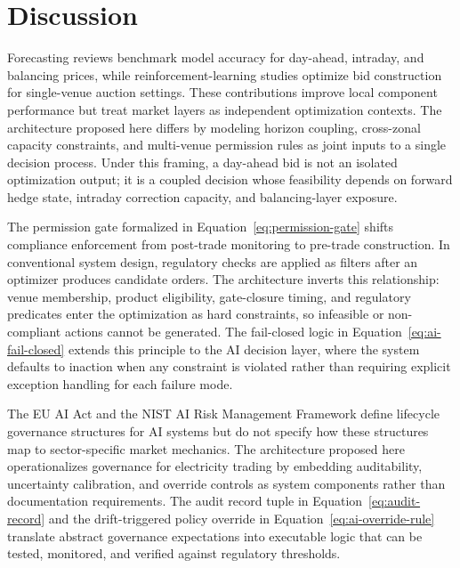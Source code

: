 \documentclass[oneside,10pt]{swissi}
\begin{document}
\section{Discussion}
Forecasting reviews benchmark model accuracy for day-ahead, intraday, and balancing prices, while reinforcement-learning studies optimize bid construction for single-venue auction settings.\cite{lago_marcjasz_schutter_weron_2021_epf,oconnor_bahloul_prestwich_visentin_2025_epf,di_persio_garbelli_giordano_2025_rl_bidding} These contributions improve local component performance but treat market layers as independent optimization contexts. The architecture proposed here differs by modeling horizon coupling, cross-zonal capacity constraints, and multi-venue permission rules as joint inputs to a single decision process.\cite{acer_market_coupling_development_2026,eu_reg_2019_943} Under this framing, a day-ahead bid is not an isolated optimization output; it is a coupled decision whose feasibility depends on forward hedge state, intraday correction capacity, and balancing-layer exposure.

The permission gate formalized in Equation~\eqref{eq:permission-gate} shifts compliance enforcement from post-trade monitoring to pre-trade construction. In conventional system design, regulatory checks are applied as filters after an optimizer produces candidate orders. The architecture inverts this relationship: venue membership, product eligibility, gate-closure timing, and regulatory predicates enter the optimization as hard constraints, so infeasible or non-compliant actions cannot be generated.\cite{acer_nemo_designation_2026,eu_reg_2011_1227_remit} The fail-closed logic in Equation~\eqref{eq:ai-fail-closed} extends this principle to the AI decision layer, where the system defaults to inaction when any constraint is violated rather than requiring explicit exception handling for each failure mode.

The EU AI Act and the NIST AI Risk Management Framework define lifecycle governance structures for AI systems but do not specify how these structures map to sector-specific market mechanics.\cite{eu_reg_2024_1689_ai_act,nist_ai_rmf_2023} The architecture proposed here operationalizes governance for electricity trading by embedding auditability, uncertainty calibration, and override controls as system components rather than documentation requirements. The audit record tuple in Equation~\eqref{eq:audit-record} and the drift-triggered policy override in Equation~\eqref{eq:ai-override-rule} translate abstract governance expectations into executable logic that can be tested, monitored, and verified against regulatory thresholds.
\end{document}
